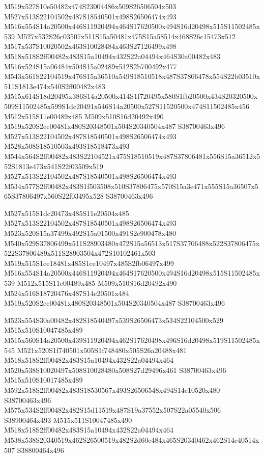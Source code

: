 \documentclass{article}
\begin{document}
\begin{multicols}{2}
M519x527S10e50482x474S23004486x509S26506504x503 M527x513S22104502x487S18540501x498S26506474x493 M516x554S14a20500x446S11920494x464S17620500x494S16d20498x515S11502485x539 M527x532S26c03507x511S15a50481x475S15a58514x468S26c15473x512 M517x537S10020502x463S10028484x463S27126499x498 M518x518S2ff00482x483S15a10494x432S22a04494x464S30a00482x483 M516x524S15a06484x504S15a02489x512S2b700492x477 M543x561S22104519x476S15a36510x549S18510518x487S37806478x554S22b03510x511S1813e474x540S2ff00482x483 M515x614S18d20495x386S14a20500x414S1f720495x580S1fb20500x434S20320500x509S11502485x599S1dc20491x546S14a20500x527S11520500x474S11502485x456 M512x515S11e00489x485 M509x510S16d20492x490 M519x520S2ec00481x480S20348501x504S20340504x487 S38700463x496 M527x513S22104502x487S18540501x498S26506474x493 M528x508S18510503x493S18518473x493 M544x564S2ff00482x483S22104521x475S18510519x487S37806481x556S15a36512x552S1813e473x541S22f03509x519 M527x513S22104502x487S18540501x498S26506474x493 M534x577S2ff00482x483S1f503508x510S37806475x570S15a3e471x555S15a36507x565S37806497x560S22f03495x528 S38700463x496

M527x515S1dc20473x485S11e20504x485 M527x513S22104502x487S18540501x498S26506474x493 M523x520S15a37499x492S15a01500x491S2e900478x480 M540x529S37806499x511S28903480x472S15a56513x517S37706488x522S37806475x522S37806489x511S28903504x472S10102461x503 M519x515S1ce18481x485S1ce10497x485S2fb06497x499 M516x554S14a20500x446S11920494x464S17620500x494S16d20498x515S11502485x539 M512x515S11e00489x485 M509x510S16d20492x490 M524x516S18720476x487S14c20501x484 M519x520S2ec00481x480S20348501x504S20340504x487 S38700463x496

M523x554S30a00482x482S18540497x539S26506473x534S22104500x529 M515x510S10047485x489 M515x560S14a20500x439S11920494x462S17620498x496S16d20498x519S11502485x545 M521x520S1f740501x505S1f748480x505S26a20488x481 M518x518S2ff00482x483S15a10494x432S22a04494x464 M520x538S10020497x508S10028480x508S27d29496x461 S38700463x496 M515x510S10017485x489 M592x518S2ff00482x483S18530567x493S26506548x494S14c10520x480 S38700463x496 M575x534S2ff00482x482S15d11519x487S19a37552x507S22a05540x506 S38900464x493 M515x511S10047485x490 M518x518S2ff00482x483S15a10494x432S22a04494x464 M538x538S20340519x462S26500519x482S2d60c484x465S20340462x462S14c40514x507 S38800464x496


\end{multicols}
\end{document}
